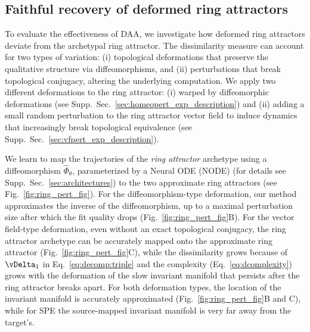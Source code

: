 \documentclass{article}
\theoremstyle{definition} \newtheorem{definition}{Definition}  \newtheorem{example}{Example}
\theoremstyle{remark} \newtheorem{remark}{Remark}
\newcounter{ct}
\newcommand{\homeo}{\Phi} %
\begin{document}
\subsection{Faithful recovery of deformed ring attractors}\label{sec:imp_ring}
To evaluate the effectiveness of DAA, we investigate how deformed ring attractors deviate from the archetypal ring attractor.
The dissimilarity measure can account for two types of variation:
(i) topological deformations that preserve the qualitative structure via diffeomorphisms, and
(ii) perturbations that break topological conjugacy, altering the underlying computation.
%
We apply two different deformations to the ring attractor:
(i) warped by diffeomorphic deformations (see Supp.~Sec.~\ref{sec:homeopert_exp_description}) and 
(ii) adding a small random perturbation to the ring attractor vector field to induce dynamics that increasingly break topological equivalence (see Supp.~Sec.~\ref{sec:vfpert_exp_description}).


We learn to map the trajectories of the \emph{ring attractor} archetype using a diffeomorphism \( \hat{\homeo}_\theta \), parameterized by a Neural ODE (NODE) \citep{chen2018neural} (for details see Supp.~Sec.~\ref{sec:architectures}) to the two approximate ring attractors (see Fig.~\ref{fig:ring_pert_fig}).
For the diffeomorphism-type deformation, our method approximates the inverse of the diffeomorphism, up to a maximal perturbation size after which the fit quality drops (Fig.~\ref{fig:ring_pert_fig}B).
For the vector field-type deformation, even without an exact topological conjugacy, the ring attractor archetype can be accurately mapped onto the approximate ring attractor (Fig.~\ref{fig:ring_pert_fig}C), while the dissimilarity grows because of $\vDelta_1$ in Eq.~\ref{eq:decomp:triple} and the complexity (Eq.~\ref{eq:dcomplexity}) grows with the deformation of the slow invariant manifold that persists after the ring attractor breaks apart.
For both deformation types, the location of the invariant manifold is accurately approximated (Fig.~\ref{fig:ring_pert_fig}B and C), while for SPE the source-mapped invariant manifold is very far away from the target's.
\end{document}
